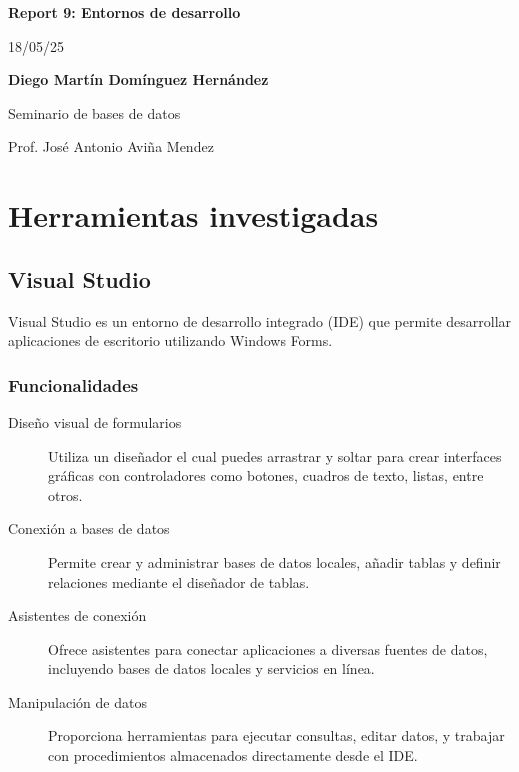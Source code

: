 \documentclass[12pt, a4paper]{article}
\begin{document}
\begin{titlepage}
\end{titlepage}

\begin{titlepage}
\begin{center}
 {\Huge\bfseries Report 9: Entornos de desarrollo\\}
 \vspace{1cm}

 {\huge 18/05/25\\}
 \vspace{2cm}

 {\Large\bfseries Diego Martín Domínguez Hernández}\\[5pt]
 \vspace{2cm}

 {\Large Seminario de bases de datos}\\[5pt]
 \vspace{2cm}

 {\Large Prof. José Antonio Aviña Mendez}\\[5pt]
\end{center}
\end{titlepage}

\newpage
\tableofcontents
\newpage

\section{Herramientas investigadas}
\subsection{Visual Studio}
Visual Studio es un entorno de desarrollo integrado (IDE) que permite desarrollar aplicaciones de escritorio utilizando Windows Forms.
\subsubsection{Funcionalidades}
\begin{description}
 \item[Diseño visual de formularios] Utiliza un diseñador el cual puedes arrastrar y soltar para crear interfaces gráficas con controladores como botones, cuadros de texto, listas, entre otros.
 \item[Conexión a bases de datos] Permite crear y administrar bases de datos locales, añadir tablas y definir relaciones mediante el diseñador de tablas.
 \item[Asistentes de conexión] Ofrece asistentes para conectar aplicaciones a diversas fuentes de datos, incluyendo bases de datos locales y servicios en línea.
 \item[Manipulación de datos] Proporciona herramientas para ejecutar consultas, editar datos, y trabajar con procedimientos almacenados directamente desde el IDE.
\end{description}
\end{document}
